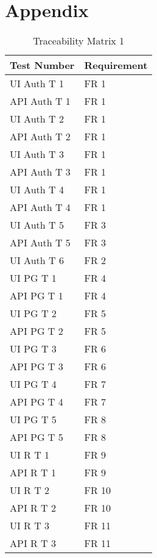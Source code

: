 \documentclass[12pt, titlepage]{article}
\begin{document}
\newpage




\newpage

\section*{Appendix}

\begin{table}[H]
	\caption{Traceability Matrix 1} \label{TraceMatrix1}
	\begin{tabular}{ll}
		\toprule
		\textbf{Test Number} & \textbf{Requirement} \\
		\midrule
		UI Auth T 1 & FR 1\\
		API Auth T 1 & FR 1\\
		UI Auth T 2 & FR 1\\
		API Auth T 2 & FR 1\\
		UI Auth T 3 & FR 1\\
		API Auth T 3 & FR 1\\
		UI Auth T 4 & FR 1\\
		API Auth T 4 & FR 1\\
		UI Auth T 5 & FR 3\\
		API Auth T 5 & FR 3\\
		UI Auth T 6 & FR 2\\
		\midrule
		UI PG T 1 & FR 4\\
		API PG T 1 & FR 4\\
		UI PG T 2 & FR 5\\
		API PG T 2 & FR 5\\
		UI PG T 3 & FR 6\\
		API PG T 3 & FR 6\\
		UI PG T 4 & FR 7\\
		API PG T 4 & FR 7\\
		UI PG T 5 & FR 8\\
		API PG T 5 & FR 8\\
		\midrule
		UI R T 1 & FR 9\\
		API R T 1 & FR 9\\
		UI R T 2 & FR 10\\
		API R T 2 & FR 10\\
		UI R T 3 & FR 11\\
		API R T 3 & FR 11\\
		\bottomrule
	\end{tabular}
\end{table}
\end{document}
